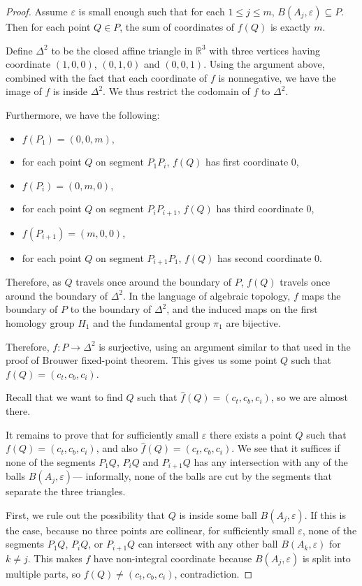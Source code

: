 \documentclass[10pt,a4paper]{amsart}
\newcommand\RR{\mathbb{R}}
\begin{document}
\begin{proof}
	Assume $\varepsilon$ is small enough such that for each $1 \leq j \leq m$,
	$B(A_j, \varepsilon) \subseteq P$.
	Then for each point $Q \in P$, the sum of coordinates of $f(Q)$ is exactly $m$.

	Define $\Delta^2$ to be the closed affine triangle in $\RR^3$ with
	three vertices having coordinate $(1, 0, 0)$, $(0, 1, 0)$ and $(0, 0, 1)$.
	Using the argument above, combined with the fact that each coordinate of $f$ is nonnegative,
	we have the image of $f$ is inside $\Delta^2$.
	We thus restrict the codomain of $f$ to $\Delta^2$.

	Furthermore, we have the following:
	\begin{itemize}
		\item $f(P_1)=(0, 0, m)$,
		\item for each point $Q$ on segment $P_1 P_i$, $f(Q)$ has first coordinate $0$,
		\item $f(P_i)=(0, m, 0)$,
		\item for each point $Q$ on segment $P_i P_{i+1}$, $f(Q)$ has third coordinate $0$,
		\item $f(P_{i+1})=(m, 0, 0)$,
		\item for each point $Q$ on segment $P_{i+1} P_1$, $f(Q)$ has second coordinate $0$.
	\end{itemize}
	Therefore, as $Q$ travels once around the boundary of $P$,
	$f(Q)$ travels once around the boundary of $\Delta^2$.
	In the language of algebraic topology, $f$ maps the boundary of $P$ to the boundary of $\Delta^2$,
	and the induced maps on the first homology group $H_1$ and the fundamental group $\pi_1$ are bijective.

	Therefore, $f \colon P \to \Delta^2$ is surjective,
	using an argument similar to that used in the proof of Brouwer fixed-point theorem.
	This gives us some point $Q$ such that $f(Q) = (c_t, c_b, c_i)$.

	Recall that we want to find $Q$ such that $\hat f(Q) =(c_t, c_b, c_i)$, so we are almost there.

	It remains to prove that for sufficiently small $\varepsilon$ there exists a point $Q$ such that $f(Q) = (c_t, c_b, c_i)$,
	and also $\hat f(Q) = (c_t, c_b, c_i)$.
	We see that it suffices if none of the segments $P_1 Q$, $P_i Q$ and $P_{i+1} Q$
	has any intersection with any of the balls $B(A_j, \varepsilon)$---%
	informally, none of the balls are cut by the segments that separate the three triangles.

	First, we rule out the possibility that $Q$ is inside some ball $B(A_j, \varepsilon)$.
	If this is the case, because no three points are collinear,
	for sufficiently small $\varepsilon$,
	none of the segments $P_1 Q$, $P_i Q$, or $P_{i+1} Q$
	can intersect with any other ball $B(A_k, \varepsilon)$ for $k \neq j$.
	This makes $f$ have non-integral coordinate because $B(A_j, \varepsilon)$ is split into multiple parts,
	so $f(Q) \neq (c_t, c_b, c_i)$, contradiction.


\end{proof}
\end{document}
